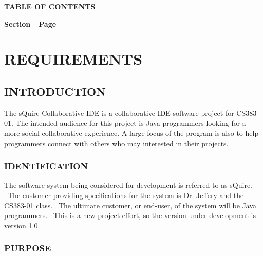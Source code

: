 \documentclass[twoside,letterpaper]{article}
\begin{document}

{\centering{}\bfseries\color{black}
TABLE OF CONTENTS
\par}


\bigskip

{\bfseries\color{black}
Section\ \ Page}

\setcounter{tocdepth}{9}
\renewcommand\contentsname{}
\tableofcontents

\bigskip

\clearpage\clearpage\setcounter{page}{1}\pagestyle{Convertii}


\section[REQUIREMENTS]{\rmfamily\bfseries REQUIREMENTS}

\subsection[INTRODUCTION]{\rmfamily\bfseries INTRODUCTION}
	\hypertarget{RefHeading15659017292}{}{
	{
	The sQuire Collaborative IDE is a collaborative IDE software project for CS383-01. The intended audience for this project is Java programmers looking for a more social collaborative experience. A large focus of the program is also to help programmers connect with others who may interested in their projects.}}
	
	\subsubsection[IDENTIFICATION]{\rmfamily\bfseries IDENTIFICATION}
	\hypertarget{RefHeading15859017292}{}
	{
	The software system being considered for development is referred to as sQuire. \ The customer
	providing specifications for the system is Dr. Jeffery and the CS383-01 class. \ The ultimate customer, or end-user, of
	the system will be Java programmers. \ This is a new project effort, so the
	version under development is version 1.0.}
	
	\subsubsection[PURPOSE]{\rmfamily\bfseries PURPOSE}
	\hypertarget{RefHeading16059017292}{}
	
\end{document}
